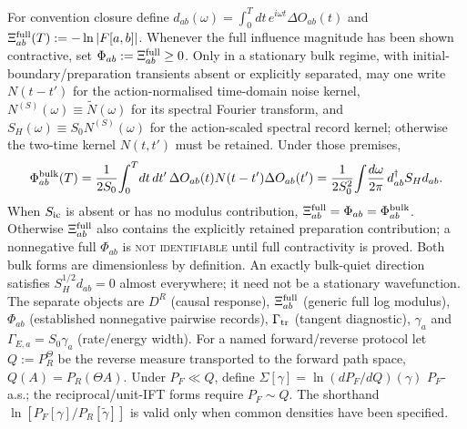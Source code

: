 \documentclass[11pt,a4paper]{article}
\begin{document}
For convention closure define
$d_{ab}(\omega)=\int_0^Tdt\,e^{i\omega t}\Delta O_{ab}(t)$ and
$\Xi_{ab}^{\rm full}(T):=-\ln|F[a,b]|$.  Whenever the full influence
magnitude has been shown contractive, set
$\Phi_{ab}:=\Xi_{ab}^{\rm full}\geq0$.  Only in a stationary
bulk regime, with
initial-boundary/preparation transients absent or explicitly separated, may
one write $N(t-t')$ for the action-normalised time-domain noise kernel,
$N^{(S)}(\omega)\equiv\widetilde N(\omega)$ for its spectral Fourier
transform, and $S_H(\omega)\equiv S_0N^{(S)}(\omega)$ for the action-scaled
spectral record kernel; otherwise the two-time kernel $N(t,t')$ must be
retained.  Under those premises,
\begin{equation}
 \Phi_{ab}^{\rm bulk}(T)=\frac{1}{2S_0}\!\int_0^T\!dt\,dt'\,
 \Delta O_{ab}(t)N(t-t')\Delta O_{ab}(t')
 =\frac{1}{2S_0^2}\!\int\!\frac{d\omega}{2\pi}\,
 d_{ab}^\dagger S_H d_{ab}.
 \label{eq:pop_pes_normalisation}
\end{equation}
When $S_{\rm ic}$ is absent or has no modulus contribution,
$\Xi_{ab}^{\rm full}=\Phi_{ab}=\Phi_{ab}^{\rm bulk}$.  Otherwise
$\Xi_{ab}^{\rm full}$ also contains the explicitly retained preparation
contribution; a nonnegative full $\Phi_{ab}$ is \textsc{not identifiable}
until full contractivity is proved.  Both bulk forms are dimensionless by
definition.  An exactly
bulk-quiet direction
satisfies $S_H^{1/2}d_{ab}=0$ almost everywhere; it need not be a stationary
wavefunction.  The separate objects are $D^R$ (causal response),
$\Xi_{ab}^{\rm full}$ (generic full log modulus), $\Phi_{ab}$ (established
nonnegative pairwise records), $\Gamma_{\rm tr}$
(tangent diagnostic),
$\gamma_a$ and $\Gamma_{E,a}=S_0\gamma_a$ (rate/energy width).  For a named
forward/reverse protocol let $Q:=P_R^\Theta$ be the reverse
measure transported to the forward path space,
$Q(A)=P_R(\Theta A)$.  Under $P_F\ll Q$, define
$\Sigma[\gamma]=\ln(dP_F/dQ)(\gamma)$ $P_F$-a.s.; the reciprocal/unit-IFT
forms require $P_F\sim Q$.  The shorthand
$\ln[P_F[\gamma]/P_R[\widetilde\gamma]]$ is valid only when common densities
have been specified.
\end{document}
